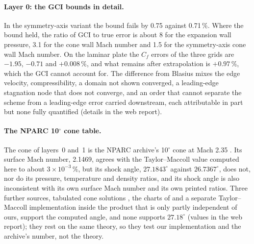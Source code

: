 \documentclass[twocolumn]{labreport}
\begin{document}
\paragraph{Layer 0: the GCI bounds in detail.}
In the symmetry-axis variant the bound fails by 0.75 against 0.71\,\%.
Where the bound held, the ratio of GCI to true error is about 8 for the expansion wall pressure, 3.1 for the cone wall Mach number and 1.5 for the symmetry-axis cone wall Mach number.
On the laminar plate the $C_f$ errors of the three grids are $-1.95$, $-0.71$ and $+0.008\,\%$, and what remains after extrapolation is $+0.97\,\%$, which the GCI cannot account for.
The difference from Blasius mixes the edge velocity, compressibility, a domain not shown converged, a leading-edge stagnation node that does not converge, and an order that cannot separate the scheme from a leading-edge error carried downstream, each attributable in part but none fully quantified (details in the web report).

\paragraph{The NPARC 10$^\circ$ cone table.}
\label{sec:cone10}
The cone of layers~0 and~1 is the NPARC archive's 10$^\circ$ cone at Mach 2.35 \citep{nparc_cone10}.
Its surface Mach number, 2.1469, agrees with the Taylor--Maccoll value computed here to about $3\times10^{-3}\,\%$, but its shock angle, $27.1843^\circ$ against $26.7367^\circ$, does not, nor do its pressure, temperature and density ratios, and its shock angle is also inconsistent with its own surface Mach number and its own printed ratios.
Three further sources, tabulated cone solutions \citep{sims1964}, the charts of \citet{ames1953} and a separate Taylor--Maccoll implementation inside the product that is only partly independent of ours, support the computed angle, and none supports $27.18^\circ$ (values in the web report); they rest on the same theory, so they test our implementation and the archive's number, not the theory.
\end{document}
